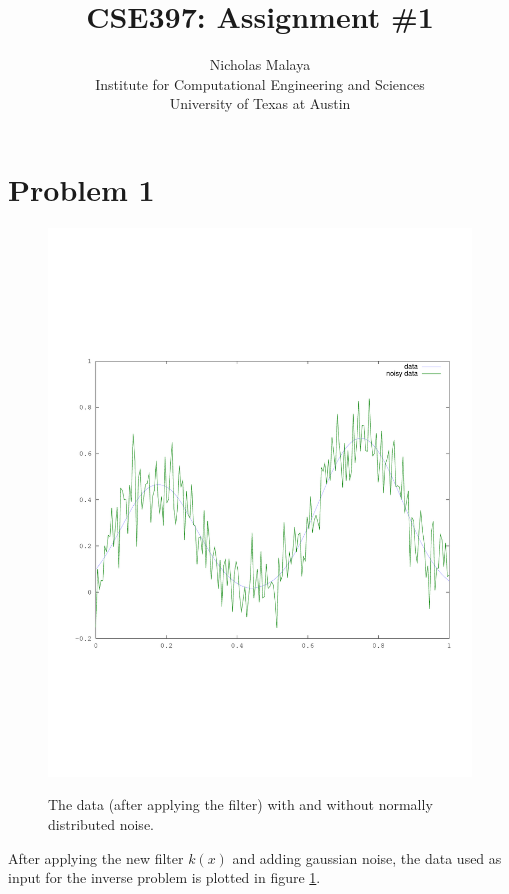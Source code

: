 \documentclass{article}
\title{\bf{CSE397: Assignment \#1}}
\author{Nicholas Malaya \\ Institute for Computational Engineering and Sciences \\ University of Texas at Austin} \date{}
\begin{document}
\maketitle

\newpage
\section{Problem 1}

\begin{figure}[p]
  \includegraphics[scale=.5]{plots/data.pdf}
  \label{fig:data}
  \caption{The data (after applying the filter) with and without normally distributed noise. }
\end{figure}

After applying the new filter $k(x)$ and adding gaussian noise, the data used as input for the inverse problem is plotted in figure \ref{fig:data}. 
\end{document}
